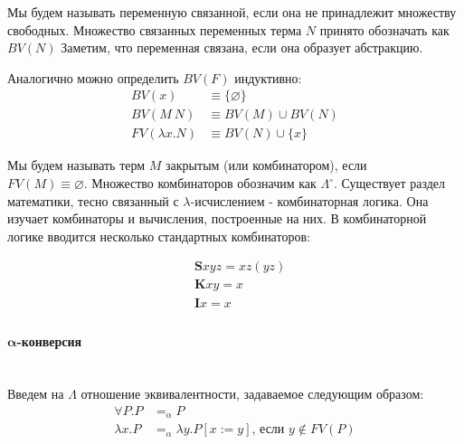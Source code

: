 \documentclass[lambda.tex]{subfiles}
\begin{document}
Мы будем называть переменную связанной, если она не принадлежит множеству свободных. Множество связанных переменных терма $N$ принято обозначать как $BV(N)$ Заметим, что переменная связана, если она образует абстракцию.

\begin{tcolorbox}
	Аналогично можно определить $BV(F)$ индуктивно:
	\begin{align*}
		BV(x) 			&\equiv \{\varnothing\}\\
		BV(M\ N) 		&\equiv BV(M)\cup BV(N)\\
		FV(\lambda x.N) &\equiv BV(N)\cup\{x\}
	\end{align*}
\end{tcolorbox}

Мы будем называть терм $M$ закрытым (или комбинатором), если\\ \(FV(M) \equiv \varnothing\). Множество комбинаторов обозначим как $\Lambda^\circ$. Существует раздел математики, тесно связанный с $\lambda$-исчислением - комбинаторная логика. Она изучает комбинаторы и вычисления, построенные на них. В комбинаторной логике вводится несколько стандартных комбинаторов:

\begin{align*}
	&\boldsymbol{S}xyz = xz(yz)\\
	&\boldsymbol{K}xy = x\\
    &\boldsymbol{I}x = x\\
\end{align*}


\newpage
\paragraph{$\boldsymbol{\alpha}$-конверсия} %
\label{par:aplha conversion} ~\\

Введем на $\Lambda$ отношение эквивалентности, задаваемое следующим образом:
\begin{align*}
	\forall P.P &=_\alpha P\\
	\lambda x.P &=_\alpha \lambda y.P[x:=y] \text{, если } y \not\in FV(P)
\end{align*}
\end{document}

